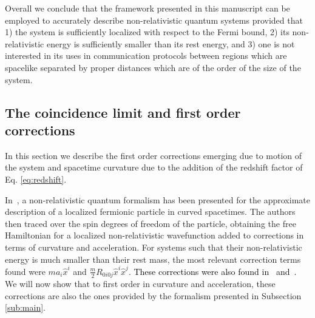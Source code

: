 \documentclass[prd,twocolumn,superscriptaddress,floatfix,amsmath,amssymb,amsfonts,longbibliography,nofootinbib]{revtex4-1}
\newcommand{\ii}{\mathrm{i}}
\newcommand{\tb}[1]{\textcolor{black}{#1}}
\begin{document}
Overall we conclude that the framework presented in this manuscript can be employed to accurately describe non-relativistic quantum systems provided that 1) the system is sufficiently localized with respect to the Fermi bound, 2) its non-relativistic energy is sufficiently smaller than its rest energy, and 3) one is not interested in its uses in communication protocols between regions which are spacelike separated by proper distances which are of the order of the size of the system. 






\subsection{The coincidence limit and first order corrections}\label{sub:coincidence}

In this section we describe the first order corrections emerging due to motion of the system and spacetime curvature due to the addition of the redshift factor of Eq. \eqref{eq:redshift}.

In~\cite{jonas}, a non-relativistic quantum formalism has been presented for the approximate description of a localized fermionic particle in curved spacetimes. The authors then traced over the spin degrees of freedom of the particle, obtaining the free Hamiltonian for a localized non-relativistic wavefunction added to corrections in terms of curvature and acceleration. For systems such that their non-relativistic energy is much smaller than their rest mass, the most relevant correction terms found were $ma_i \hat{x}^i$ and $\frac{m}{2}R_{0i0j}\hat{x}^i\hat{x}^j$. \tb{These corrections were also found in~\cite{roura} and~\cite{theguy}.} We will now show that to first order in curvature and acceleration, these corrections are also the ones provided by the formalism presented in Subsection \ref{sub:main}. 
\end{document}
